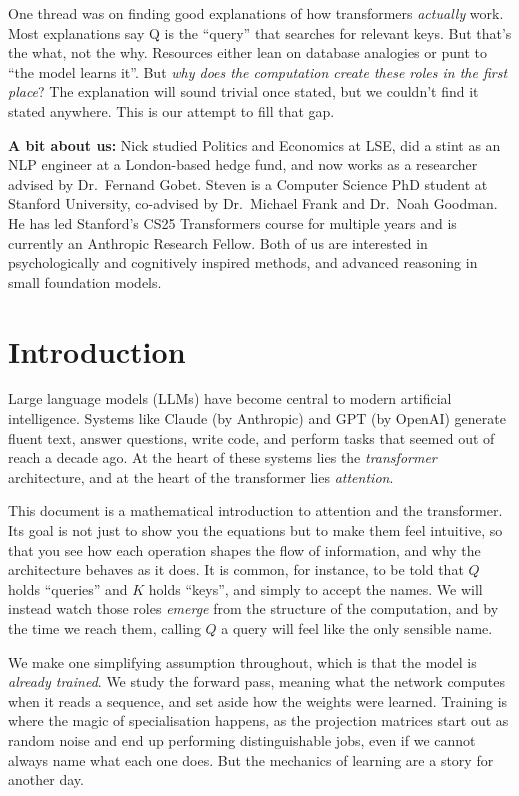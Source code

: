 \documentclass[11pt]{article}
\begin{document}
One thread was on finding good explanations of how transformers \textit{actually} work. Most explanations say Q is the ``query'' that searches for relevant keys. But that's the what, not the why. Resources either lean on database analogies or punt to ``the model learns it''. But \textit{why does the computation create these roles in the first place}? The explanation will sound trivial once stated, but we couldn't find it stated anywhere. This is our attempt to fill that gap.

\textbf{A bit about us:} Nick studied Politics and Economics at LSE, did a stint as an NLP engineer at a London-based hedge fund, and now works as a researcher advised by Dr.\ Fernand Gobet. Steven is a Computer Science PhD student at Stanford University, co-advised by Dr.\ Michael Frank and Dr.\ Noah Goodman. He has led Stanford's CS25 Transformers course for multiple years and is currently an Anthropic Research Fellow. Both of us are interested in psychologically and cognitively inspired methods, and advanced reasoning in small foundation models.

\newpage

\section{Introduction}

Large language models (LLMs) have become central to modern artificial intelligence. Systems like Claude (by Anthropic) and GPT (by OpenAI) generate fluent text, answer questions, write code, and perform tasks that seemed out of reach a decade ago. At the heart of these systems lies the \textit{transformer} architecture, and at the heart of the transformer lies \textit{attention}.

This document is a mathematical introduction to attention and the transformer. Its goal is not just to show you the equations but to make them feel intuitive, so that you see how each operation shapes the flow of information, and why the architecture behaves as it does. It is common, for instance, to be told that $Q$ holds ``queries'' and $K$ holds ``keys'', and simply to accept the names. We will instead watch those roles \textit{emerge} from the structure of the computation, and by the time we reach them, calling $Q$ a query will feel like the only sensible name.

We make one simplifying assumption throughout, which is that the model is \textit{already trained}. We study the forward pass, meaning what the network computes when it reads a sequence, and set aside how the weights were learned. Training is where the magic of specialisation happens, as the projection matrices start out as random noise and end up performing distinguishable jobs, even if we cannot always name what each one does. But the mechanics of learning are a story for another day.
\end{document}
